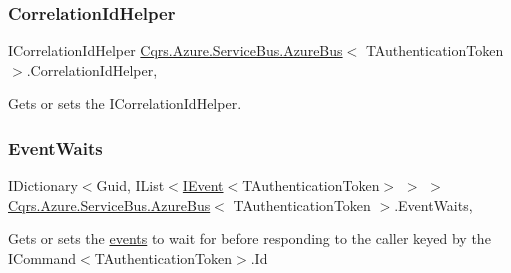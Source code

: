 \subsubsection{\texorpdfstring{Correlation\+Id\+Helper}{CorrelationIdHelper}}
{\footnotesize\ttfamily I\+Correlation\+Id\+Helper \hyperlink{classCqrs_1_1Azure_1_1ServiceBus_1_1AzureBus}{Cqrs.\+Azure.\+Service\+Bus.\+Azure\+Bus}$<$ T\+Authentication\+Token $>$.Correlation\+Id\+Helper\hspace{0.3cm}{\ttfamily [get]}, {\ttfamily [protected]}}



Gets or sets the I\+Correlation\+Id\+Helper. 

\mbox{\label{classCqrs_1_1Azure_1_1ServiceBus_1_1AzureBus_ae3c0fd5566add5441bb70b48eceb98be_ae3c0fd5566add5441bb70b48eceb98be}} 
\subsubsection{\texorpdfstring{Event\+Waits}{EventWaits}}
{\footnotesize\ttfamily I\+Dictionary$<$Guid, I\+List$<$\hyperlink{interfaceCqrs_1_1Events_1_1IEvent}{I\+Event}$<$T\+Authentication\+Token$>$ $>$ $>$ \hyperlink{classCqrs_1_1Azure_1_1ServiceBus_1_1AzureBus}{Cqrs.\+Azure.\+Service\+Bus.\+Azure\+Bus}$<$ T\+Authentication\+Token $>$.Event\+Waits\hspace{0.3cm}{\ttfamily [get]}, {\ttfamily [protected]}}



Gets or sets the \hyperlink{}{events} to wait for before responding to the caller keyed by the I\+Command$<$\+T\+Authentication\+Token$>$.\+Id 

\mbox{\label{classCqrs_1_1Azure_1_1ServiceBus_1_1AzureBus_ad9bfb86c6f7724ce0729d45ddad4fbf5_ad9bfb86c6f7724ce0729d45ddad4fbf5}} 
